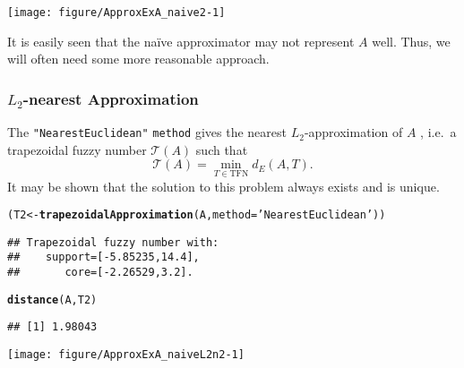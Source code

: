 \documentclass[11pt]{article}\usepackage[]{graphicx}\usepackage[]{color}
\makeatletter
\newcommand{\hlstr}[1]{\textcolor[rgb]{0.192,0.494,0.8}{#1}}%
\newcommand{\hlstd}[1]{\textcolor[rgb]{0.345,0.345,0.345}{#1}}%
\newcommand{\hlkwb}[1]{\textcolor[rgb]{0.69,0.353,0.396}{#1}}%
\newcommand{\hlkwc}[1]{\textcolor[rgb]{0.333,0.667,0.333}{#1}}%
\newcommand{\hlkwd}[1]{\textcolor[rgb]{0.737,0.353,0.396}{\textbf{#1}}}%
\newenvironment{kframe}{%
 \def\at@end@of@kframe{}%
 \ifinner\ifhmode%
  \def\at@end@of@kframe{\end{minipage}}%
  \begin{minipage}{\columnwidth}%
 \fi\fi%
 \def\FrameCommand##1{\hskip\@totalleftmargin \hskip-\fboxsep
 \colorbox{shadecolor}{##1}\hskip-\fboxsep
     \hskip-\linewidth \hskip-\@totalleftmargin \hskip\columnwidth}%
 \MakeFramed {\advance\hsize-\width
   \@totalleftmargin\z@ \linewidth\hsize
   \@setminipage}}%
 {\par\unskip\endMakeFramed%
 \at@end@of@kframe}
\newenvironment{knitrout}{}{} %
\newcommand{\argument}[1]{\texttt{\hlkwc{#1}}}
\newcommand{\str}[1]{\texttt{\hlstr{#1}}}
\makeatother
\begin{document}
\begin{center}
\begin{knitrout}\small
{}\color{fgcolor}

{\centering \texttt{[image: figure/ApproxExA\_naive2-1]} 

}



\end{knitrout}
\end{center}

It is easily seen that the na\"{i}ve approximator
may not represent $A$ well.
Thus, we will often need some more reasonable
approach.


\subsubsection{$L_2$-nearest Approximation}





The \str{"{}NearestEuclidean"{}} \argument{method}
gives the nearest $L_2$-approximation of $A$
\cite[Corollary 8]{Ban2009:nearestfnrev},
i.e.~a trapezoidal fuzzy number $\mathcal{T}(A)$ such that
\[
\mathcal{T}(A)=\min\limits_{T\in \mathrm{TFN}}d_E(A,T).
\]
It may be shown that the solution to this problem
always exists and is unique.

\begin{knitrout}\small
{}\color{fgcolor}\begin{kframe}
\begin{alltt}
\hlstd{(T2} \hlkwb{<-} \hlkwd{trapezoidalApproximation}\hlstd{(A,} \hlkwc{method}\hlstd{=}\hlstr{'NearestEuclidean'}\hlstd{))}
\end{alltt}
\begin{verbatim}
## Trapezoidal fuzzy number with:
##    support=[-5.85235,14.4],
##       core=[-2.26529,3.2].
\end{verbatim}
\begin{alltt}
\hlkwd{distance}\hlstd{(A, T2)}
\end{alltt}
\begin{verbatim}
## [1] 1.98043
\end{verbatim}
\end{kframe}
\end{knitrout}

\begin{center}
\begin{knitrout}\small
{}\color{fgcolor}

{\centering \texttt{[image: figure/ApproxExA\_naiveL2n2-1]} 

}



\end{knitrout}
\end{center}
\end{document}
